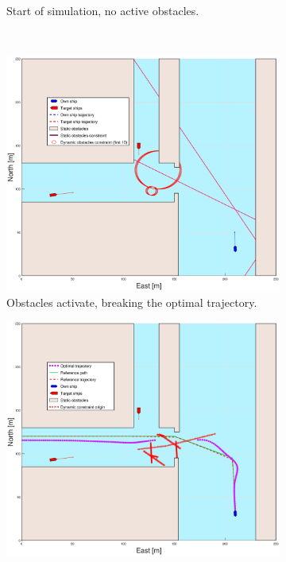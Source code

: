 \begin{figure}[!ht]
\begin{subfigure}{0.499\textwidth}
        \caption{Start of simulation, no active obstacles.}
    \end{subfigure}
    \hfill
    \\
    \begin{subfigure}{0.49\textwidth}
        \centering
        \includegraphics[width=\textwidth]{Images/Figures/Extra_Stuff/BlockedPath_Pos_t=2}
        \caption{Obstacles activate, breaking the optimal trajectory.}
    \end{subfigure}
    \begin{subfigure}{0.499\textwidth}
        \centering
        \includegraphics[width=\textwidth]{Images/Figures/Extra_Stuff/BlockedPath_Wopt_t=2}

\end{subfigure}
\end{figure}
